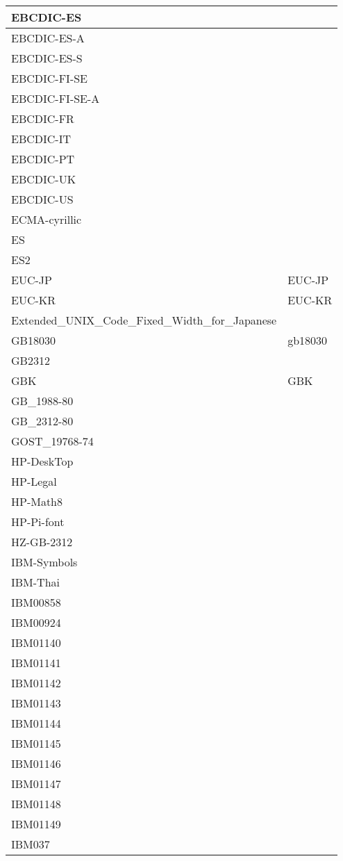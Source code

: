 \documentclass{wg21}
\begin{document}
\begin{longtable}{| p{} | p{} |}
EBCDIC-ES & \\ \hline
EBCDIC-ES-A & \\ \hline
EBCDIC-ES-S & \\ \hline
EBCDIC-FI-SE & \\ \hline
EBCDIC-FI-SE-A & \\ \hline
EBCDIC-FR & \\ \hline
EBCDIC-IT & \\ \hline
EBCDIC-PT & \\ \hline
EBCDIC-UK & \\ \hline
EBCDIC-US & \\ \hline
ECMA-cyrillic & \\ \hline
ES & \\ \hline
ES2 & \\ \hline
EUC-JP & EUC-JP\\ \hline
EUC-KR & EUC-KR\\ \hline
Extended_UNIX_Code_Fixed_Width_for_Japanese & \\ \hline
GB18030 & gb18030\\ \hline
GB2312 & \\ \hline
GBK & GBK\\ \hline
GB_1988-80 & \\ \hline
GB_2312-80 & \\ \hline
GOST_19768-74 & \\ \hline
HP-DeskTop & \\ \hline
HP-Legal & \\ \hline
HP-Math8 & \\ \hline
HP-Pi-font & \\ \hline
HZ-GB-2312 & \\ \hline
IBM-Symbols & \\ \hline
IBM-Thai & \\ \hline
IBM00858 & \\ \hline
IBM00924 & \\ \hline
IBM01140 & \\ \hline
IBM01141 & \\ \hline
IBM01142 & \\ \hline
IBM01143 & \\ \hline
IBM01144 & \\ \hline
IBM01145 & \\ \hline
IBM01146 & \\ \hline
IBM01147 & \\ \hline
IBM01148 & \\ \hline
IBM01149 & \\ \hline
IBM037 & \\ \hline

\end{longtable}
\end{document}
